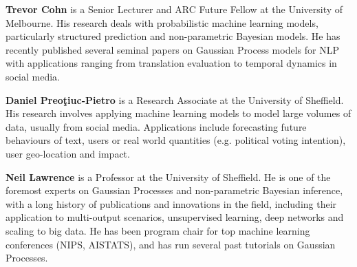 \begin{bio}
  {\bfseries Trevor Cohn} is a Senior Lecturer and ARC Future Fellow at the University of
  Melbourne. His research deals with probabilistic machine learning models, particularly structured
  prediction and non-parametric Bayesian models. He has recently published several seminal papers on
  Gaussian Process models for NLP with applications ranging from translation evaluation to temporal
  dynamics in social media.

  {\bfseries Daniel Preoţiuc-Pietro} is a Research Associate at the University of Sheffield. His
  research involves applying machine learning models to model large volumes of data, usually from
  social media. Applications include forecasting future behaviours of text, users or real world
  quantities (e.g. political voting intention), user geo-location and impact.

  {\bfseries Neil Lawrence} is a Professor at the University of Sheffield. He is one of the foremost
  experts on Gaussian Processes and non-parametric Bayesian inference, with a long history of
  publications and innovations in the field, including their application to multi-output scenarios,
  unsupervised learning, deep networks and scaling to big data. He has been program chair for top
  machine learning conferences (NIPS, AISTATS), and has run several past tutorials on Gaussian
  Processes.

\end{bio}

